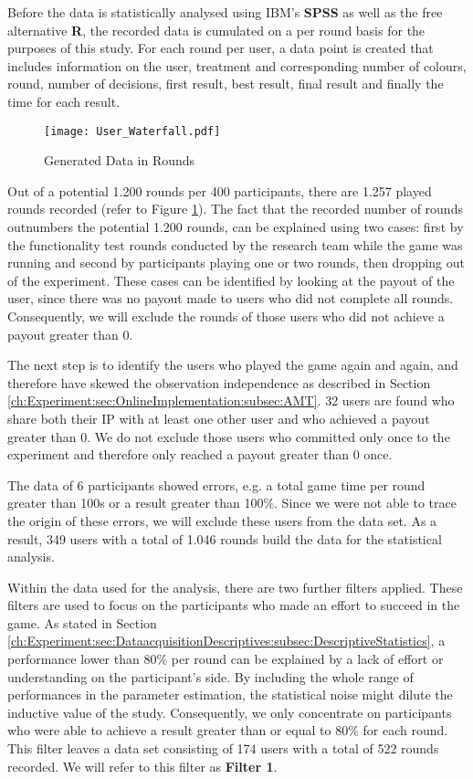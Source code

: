 Before the data is statistically analysed using IBM's \textbf{SPSS} as well as the free alternative \textbf{R}, the recorded data is cumulated on a per round basis for the purposes of this study. For each round per user, a data point is created that includes information on the user, treatment and corresponding number of colours, round, number of decisions, first result, best result, final result and finally the time for each result.
 \begin{figure}[htp] %
\begin{center} %
  \texttt{[image: User\_Waterfall.pdf]}
  \caption{Generated Data in Rounds}
  \label{Data}
\end{center}
\end{figure}
Out of a potential 1.200 rounds per 400 participants, there are 1.257 played rounds recorded (refer to Figure \ref{Data}). The fact that the recorded number of rounds outnumbers the potential 1.200 rounds, can be explained using two cases: first by the functionality test rounds conducted by the research team while the game was running and second by participants playing one or two rounds, then dropping out of the experiment. These cases can be identified by looking at the payout of the user, since there was no payout made to users who did not complete all rounds. Consequently, we will exclude the rounds of those users who did not achieve a payout greater than 0.

The next step is to identify the users who played the game again and again, and therefore have skewed the observation independence as described in Section \ref{ch:Experiment:sec:OnlineImplementation:subsec:AMT}. 32 users are found who share both their IP with at least one other user and who achieved a payout greater than 0. We do not exclude those users who committed only once to the experiment and therefore only reached a payout greater than 0 once.

The data of 6 participants showed errors, e.g. a total game time per round greater than 100s or a result greater than 100\%. Since we were not able to trace the origin of these errors, we will exclude these users from the data set.
As a result, 349 users with a total of 1.046 rounds build the data for the statistical analysis.

Within the data used for the analysis, there are two further filters applied.
These filters are used to focus on the participants who made an effort to succeed in the game. As stated in Section \ref{ch:Experiment:sec:DataacquisitionDescriptives:subsec:DescriptiveStatistics}, a performance lower than 80\% per round can be explained by a lack of effort or understanding on the participant's side. By including the whole range of performances in the parameter estimation, the statistical noise might dilute the inductive value of the study. Consequently, we only concentrate on participants who were able to achieve a result greater than or equal to 80\% for each round. This filter leaves a data set consisting of 174 users with a total of 522 rounds recorded. We will refer to this filter as \textbf{Filter 1}.

